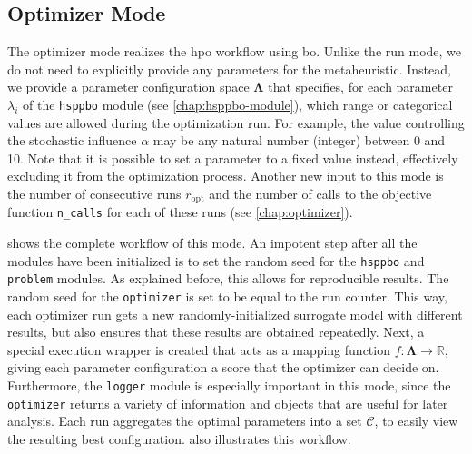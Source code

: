\subsection{Optimizer Mode}
\label{chap:opt-mode}

The optimizer mode realizes the \glsdesc{hpo} workflow using \glsdesc{bo}. Unlike the run mode, we do not need to explicitly provide any parameters for the metaheuristic. Instead, we provide a parameter configuration space $\mathbf{\Lambda}$ that specifies, for each parameter $\lambda_i$ of the \texttt{hsppbo} module (see \cref{chap:hsppbo-module}), which range or categorical values are allowed during the optimization run. For example, the value controlling the stochastic influence $\alpha$ may be any natural number (integer) between 0 and 10. Note that it is possible to set a parameter to a fixed value instead, effectively excluding it from the optimization process. Another new input to this mode is the number of consecutive runs $r_{\text{opt}}$ and the number of calls to the objective function \texttt{n\_calls} for each of these runs (see \cref{chap:optimizer}).

 shows the complete workflow of this mode. An impotent step after all the modules have been initialized is to set the random seed for the \texttt{hsppbo} and \texttt{problem} modules. As explained before, this allows for reproducible results. The random seed for the \texttt{optimizer} is set to be equal to the run counter. This way, each optimizer run gets a new randomly-initialized surrogate model with different results, but also ensures that these results are obtained repeatedly. Next, a special execution wrapper is created that acts as a mapping function $f: \mathcal{\mathbf{\Lambda}} \to \mathbb{R}$, giving each parameter configuration a score that the optimizer can decide on. Furthermore, the \texttt{logger} module is especially important in this mode, since the \texttt{optimizer} returns a variety of information and objects that are useful for later analysis. Each run aggregates the optimal parameters into a set $\mathcal{C}$, to easily view the resulting best configuration.  also illustrates this workflow.

